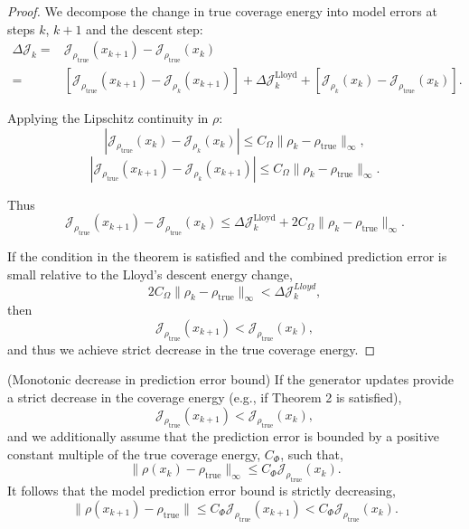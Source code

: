 \documentclass[onefignum,onetabnum]{siamart171218} %
\begin{document}
\begin{proof}
We decompose the change in true coverage energy into model errors at steps $k$, $k+1$ and the descent step:
\begin{align*}
    \Delta\mathcal{J}_k=&\mathcal{J}_{\rho_{\mathrm{true}}}(x_{k+1}) - \mathcal{J}_{\rho_{\mathrm{true}}}(x_k)
    \\
    =& \left[\mathcal{J}_{\rho_{\mathrm{true}}}(x_{k+1}) - \mathcal{J}_{\rho_k}(x_{k+1})\right]
    + \Delta \mathcal{J}_k^{\mathrm{Lloyd}}
    + \left[\mathcal{J}_{\rho_k}(x_k) - \mathcal{J}_{\rho_{\mathrm{true}}}(x_k)\right].
\end{align*}

Applying the Lipschitz continuity in $\rho$:
\[
    |\mathcal{J}_{\rho_{\mathrm{true}}}(x_k) - \mathcal{J}_{\rho_k}(x_k)| \leq C_\Omega \|\rho_k - \rho_{\mathrm{true}}\|_\infty,
\]
\[
    |\mathcal{J}_{\rho_{\mathrm{true}}}(x_{k+1}) - \mathcal{J}_{\rho_k}(x_{k+1})| \leq C_\Omega \|\rho_k - \rho_{\mathrm{true}}\|_\infty.
\]

Thus
\[
    \mathcal{J}_{\rho_{\mathrm{true}}}(x_{k+1}) - \mathcal{J}_{\rho_{\mathrm{true}}}(x_k)
    \leq \Delta \mathcal{J}_k^{\mathrm{Lloyd}} + 2C_\Omega \|\rho_k - \rho_{\mathrm{true}}\|_\infty.
\]

If the condition in the theorem is satisfied and the combined prediction error is small relative to the Lloyd's descent energy change,
\[
    2C_\Omega \|\rho_k - \rho_{\mathrm{true}}\|_\infty  < \Delta \mathcal{J}_k^{Lloyd},
\]
then
\[
    \mathcal{J}_{\rho_{\mathrm{true}}}(x_{k+1}) < \mathcal{J}_{\rho_{\mathrm{true}}}(x_k),
\]
and thus we achieve strict decrease in the true coverage energy.


\end{proof}

\begin{theorem}
\label{thm:3}
(Monotonic decrease in prediction error bound)
If the generator updates provide a strict decrease in the coverage energy (e.g., if Theorem 2 is satisfied),
\[
    \mathcal{J}_{\rho_{\mathrm{true}}}(x_{k+1}) < \mathcal{J}_{\rho_{\mathrm{true}}}(x_k),
\]
and we additionally assume that the prediction error is bounded by a positive constant multiple of the true coverage energy, $C_\Phi$, such that,
\[
    \|\rho(x_k) - \rho_{\mathrm{true}}\|_\infty \leq C_\Phi\mathcal{J}_{\rho_{\mathrm{true}}}(x_k).
\]
It follows that the model prediction error bound is strictly decreasing,
\[
    \|\rho(x_{k+1}) - \rho_{\mathrm{true}}\| \leq C_\Phi \mathcal{J}_{\rho_{\mathrm{true}}}(x_{k+1}) < C_\Phi \mathcal{J}_{\rho_{\mathrm{true}}}(x_k).
\]
\end{theorem}
\end{document}
